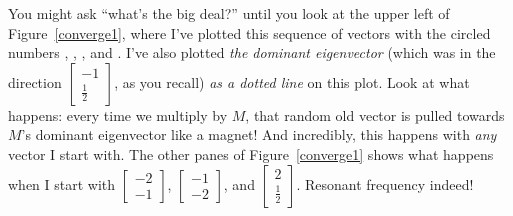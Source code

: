 You might ask ``what's the big deal?'' until you look at the upper left of
Figure~\ref{converge1}, where I've plotted this sequence of vectors with the
circled numbers , , , and . I've also
plotted \textit{the dominant eigenvector} (which was in the direction
{\footnotesize $\begin{bmatrix} -1 \\ \frac{1}{2} \end{bmatrix}$}, as you
recall) \textit{as a dotted line} on this plot. Look at what happens: every
time we multiply by $M$, that random old vector is pulled towards $M$'s
dominant eigenvector like a magnet! And incredibly, this happens with
\textit{any} vector I start with. The other panes of Figure~\ref{converge1}
shows what happens when I start with {\footnotesize $\begin{bmatrix} -2 \\ -1
\end{bmatrix}$}, {\footnotesize $\begin{bmatrix} -1 \\ -2 \end{bmatrix}$}, and
{\footnotesize $\begin{bmatrix} 2 \\ \frac{1}{2} \end{bmatrix}$}. Resonant
frequency indeed!

